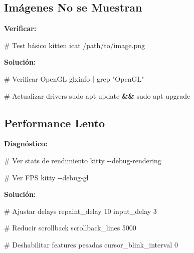 \documentclass[
  doc,
  floatsintext,
  longtable,
  a4paper,
  nolmodern,
  notxfonts,
  notimes,
  12pt,
  colorlinks=true,linkcolor=blue,citecolor=blue,urlcolor=blue]{apa7}
\newenvironment{Shaded}{\begin{snugshade}}{\end{snugshade}}
\newcommand{\AttributeTok}[1]{\textcolor[rgb]{0.40,0.45,0.13}{#1}}
\newcommand{\CommentTok}[1]{\textcolor[rgb]{0.37,0.37,0.37}{#1}}
\newcommand{\DataTypeTok}[1]{\textcolor[rgb]{0.68,0.00,0.00}{#1}}
\newcommand{\ExtensionTok}[1]{\textcolor[rgb]{0.00,0.23,0.31}{#1}}
\newcommand{\FunctionTok}[1]{\textcolor[rgb]{0.28,0.35,0.67}{#1}}
\newcommand{\KeywordTok}[1]{\textcolor[rgb]{0.00,0.23,0.31}{\textbf{#1}}}
\newcommand{\NormalTok}[1]{\textcolor[rgb]{0.00,0.23,0.31}{#1}}
\newcommand{\StringTok}[1]{\textcolor[rgb]{0.13,0.47,0.30}{#1}}
\begin{document}
\subsection{Imágenes No se Muestran}\label{imuxe1genes-no-se-muestran}

\textbf{Verificar:}

\begin{Shaded}
\begin{Highlighting}[]
\CommentTok{\# Test básico}
\ExtensionTok{kitten}\NormalTok{ icat /path/to/image.png}
\end{Highlighting}
\end{Shaded}

\textbf{Solución:}

\begin{Shaded}
\begin{Highlighting}[]
\CommentTok{\# Verificar OpenGL}
\ExtensionTok{glxinfo} \KeywordTok{|} \FunctionTok{grep} \StringTok{"OpenGL"}

\CommentTok{\# Actualizar drivers}
\FunctionTok{sudo}\NormalTok{ apt update }\KeywordTok{\&\&} \FunctionTok{sudo}\NormalTok{ apt upgrade}
\end{Highlighting}
\end{Shaded}

\subsection{Performance Lento}\label{performance-lento}

\textbf{Diagnóstico:}

\begin{Shaded}
\begin{Highlighting}[]
\CommentTok{\# Ver stats de rendimiento}
\ExtensionTok{kitty} \AttributeTok{{-}{-}debug{-}rendering}

\CommentTok{\# Ver FPS}
\ExtensionTok{kitty} \AttributeTok{{-}{-}debug{-}gl}
\end{Highlighting}
\end{Shaded}

\textbf{Solución:}

\begin{Shaded}
\begin{Highlighting}[]
\CommentTok{\# Ajustar delays}
\DataTypeTok{repaint\_delay} \DataTypeTok{10}
\DataTypeTok{input\_delay} \DataTypeTok{3}

\CommentTok{\# Reducir scrollback}
\DataTypeTok{scrollback\_lines} \DataTypeTok{5000}

\CommentTok{\# Deshabilitar features pesadas}
\DataTypeTok{cursor\_blink\_interval} \DataTypeTok{0}
\end{Highlighting}
\end{Shaded}
\end{document}
